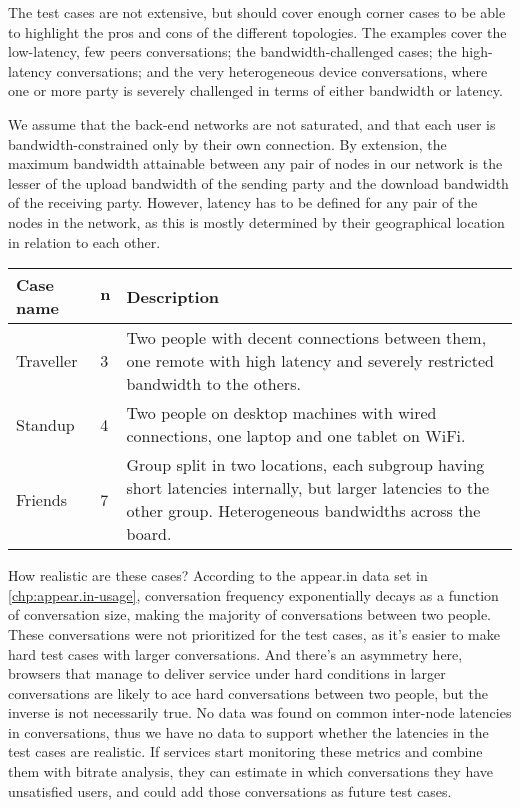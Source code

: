The test cases are not extensive, but should cover enough corner cases to be able to highlight the pros and cons of the different topologies. The examples cover the low-latency, few peers conversations; the bandwidth-challenged cases; the high-latency conversations; and the very heterogeneous device conversations, where one or more party is severely challenged in terms of either bandwidth or latency.

We assume that the back-end networks are not saturated, and that each user is bandwidth-constrained only by their own connection. By extension, the maximum bandwidth attainable between any pair of nodes in our network is the lesser of the upload bandwidth of the sending party and the download bandwidth of the receiving party. However, latency has to be defined for any pair of the nodes in the network, as this is mostly determined by their geographical location in relation to each other.

\begin{center}
    \label{tab:test-cases}
    \begin{tabular}{| l | l | p{7cm} |}
    \hline
    \textbf{Case name} & $\textbf{n}$ & \textbf{Description} \\ \hline
    Traveller & 3 & Two people with decent connections between them, one remote with high latency and severely restricted bandwidth to the others. \\ \hline
    Standup & 4 & Two people on desktop machines with wired connections, one laptop and one tablet on WiFi. \\ \hline
    Friends & 7 & Group split in two locations, each subgroup having short latencies internally, but larger latencies to the other group. Heterogeneous bandwidths across the board. \\ \hline
    \end{tabular}
\end{center}

How realistic are these cases? According to the appear.in data set in \autoref{chp:appear.in-usage}, conversation frequency exponentially decays as a function of conversation size, making the majority of conversations between two people. These conversations were not prioritized for the test cases, as it's easier to make hard test cases with larger conversations. And there's an asymmetry here, browsers that manage to deliver service under hard conditions in larger conversations are likely to ace hard conversations between two people, but the inverse is not necessarily true. No data was found on common inter-node latencies in conversations, thus we have no data to support whether the latencies in the test cases are realistic. If services start monitoring these metrics and combine them with bitrate analysis, they can estimate in which conversations they have unsatisfied users, and could add those conversations as future test cases.


